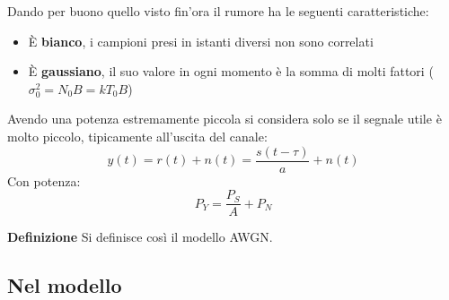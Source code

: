 \documentclass{article}
\newcommand{\df}{\noindent\textbf{Definizione} }
\begin{document}
\newpage 

\noindent Dando per buono quello visto fin'ora il rumore ha le seguenti caratteristiche:
\begin{itemize}
    \item È \textbf{bianco}, i campioni presi in istanti diversi non sono correlati
    \item È \textbf{gaussiano}, il suo valore in ogni momento è la somma di molti fattori ($\sigma_0^2=N_0B=kT_0B$)\newline
\end{itemize}

\noindent Avendo una potenza estremamente piccola si considera solo se il segnale utile è molto piccolo, tipicamente all'uscita del canale:
$$y(t)=r(t)+n(t)=\frac{s(t-\tau)}{a}+n(t)$$
\noindent Con potenza:
$$P_Y=\frac{P_S}{A}+P_N$$\newline

\df Si definisce così il modello AWGN.

\subsection{Nel modello}
\end{document}
